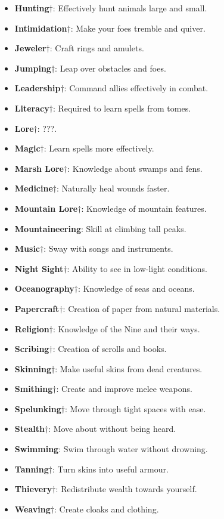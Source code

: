 \documentclass{article}
\begin{document}
\begin{itemize}
\item {\bf Hunting}$\dagger$: Effectively hunt animals large and small. 
\item {\bf Intimidation}$\dagger$: Make your foes tremble and quiver. 
\item {\bf Jeweler}$\dagger$: Craft rings and amulets. 
\item {\bf Jumping}$\dagger$: Leap over obstacles and foes.
\item {\bf Leadership}$\dagger$: Command allies effectively in combat. 
\item {\bf Literacy}$\dagger$: Required to learn spells from tomes. 
\item {\bf Lore}$\dagger$: ???. 
\item {\bf Magic}$\dagger$: Learn spells more effectively. 
\item {\bf Marsh Lore}$\dagger$: Knowledge about swamps and fens. 
\item {\bf Medicine}$\dagger$: Naturally heal wounds faster. 
\item {\bf Mountain Lore}$\dagger$: Knowledge of mountain features. 
\item {\bf Mountaineering}: Skill at climbing tall peaks. 
\item {\bf Music}$\dagger$: Sway with songs and instruments. 
\item {\bf Night Sight}$\dagger$: Ability to see in low-light conditions. 
\item {\bf Oceanography}$\dagger$: Knowledge of seas and oceans. 
\item {\bf Papercraft}$\dagger$: Creation of paper from natural materials. 
\item {\bf Religion}$\dagger$: Knowledge of the Nine and their ways. 
\item {\bf Scribing}$\dagger$: Creation of scrolls and books. 
\item {\bf Skinning}$\dagger$: Make useful skins from dead creatures. 
\item {\bf Smithing}$\dagger$: Create and improve melee weapons.
\item {\bf Spelunking}$\dagger$: Move through tight spaces with ease.
\item {\bf Stealth}$\dagger$: Move about without being heard.
\item {\bf Swimming}: Swim through water without drowning.
\item {\bf Tanning}$\dagger$: Turn skins into useful armour.
\item {\bf Thievery}$\dagger$: Redistribute wealth towards yourself.
\item {\bf Weaving}$\dagger$: Create cloaks and clothing.
\end{itemize}
\end{document}
